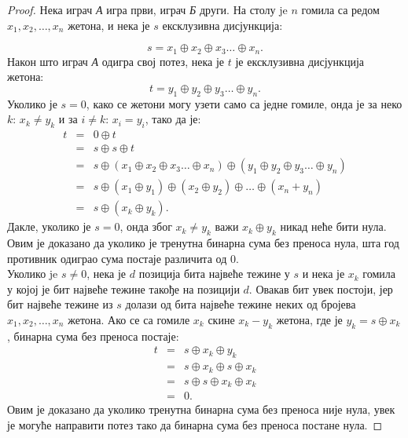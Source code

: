 \documentclass[a4paper]{article}
\begin{document}
\begin{proof}
	Нека играч \textit{А} игра први, играч \textit{Б} други. На столу je $ n $ гомила са редом $ x_{1}, x_{2}, \ldots , x_{n} $ жетона, и нека је $ s $ ексклузивна дисјункција: 
	
	\begin{displaymath}
		s = x_{1} \oplus x_{2} \oplus x_{3} \ldots \oplus x_{n}.
	\end{displaymath}	
	Након што играч \textit{А} одигра свој потез, нека је $ t $ је ексклузивна дисјункција жетона:
	\begin{displaymath}
		t = y_{1} \oplus y_{2} \oplus y_{3} \ldots \oplus y_{n}.
	\end{displaymath}
	 Уколико је $ s = 0 $, како се жетони могу узети само са једне гомиле, онда је за неко $ k $: $ x_{k} \neq y_{k} $ и за $ i \neq k $: $ x_{i} = y_{i} $, тако да је:	 
	 \begin{eqnarray*}
	 	t &=& 0 \oplus t \\
		  &=& s \oplus s \oplus t \\
		  &=& s \oplus (x_{1} \oplus x_{2} \oplus x_{3} \ldots \oplus x_{n}) \oplus (y_{1} \oplus y_{2} \oplus y_{3} \ldots \oplus y_{n}) \\
		  &=& s \oplus (x_{1} \oplus y_{1}) \oplus (x_{2} \oplus y_{2}) \oplus  \ldots \oplus (x_{n} + y_{n}) \\
		  &=& s \oplus (x_{k} \oplus y_{k}). 		 
	 \end{eqnarray*}
	 Дакле, уколико је $ s = 0 $, онда због $ x_{k} \neq y_{k} $ важи $ x_{k} \oplus y_{k} $ никад неће бити нула. Овим је доказано да уколико је тренутна бинарна сума без преноса нула, шта год противник одиграо сума постаје различита од $ 0 $.\\	 
	 Уколико je $ s \neq 0 $, нека је $ d $ позиција бита највеће тежине у $ s $ и нека је $ x_{k} $ гомила у којој је бит највеће тежине такође на позицији $ d $. Овакав бит увек постоји, јер бит највеће тежине из $ s $ долази од бита највеће тежине неких од бројева $ x_{1}, x_{2}, \ldots , x_{n} $ жетона. Ако се са гомиле $ x_{k} $ скине $ x_{k} - y_{k} $ жетона, где је $ y_{k} = s \oplus x_{k} $, бинарна сума без преноса постаје:
	 \begin{eqnarray*}
	 	t &=& s \oplus x_{k} \oplus y_{k} \\ 
	 	&=& s \oplus x_{k} \oplus s \oplus x_{k} \\
	 	&=& s \oplus s \oplus x_{k} \oplus x_{k} \\
	 	&=& 0.	 
	 \end{eqnarray*}	 
	 Овим је доказано да уколико тренутна бинарна сума без преноса није нула, увек је могуће направити потез тако да бинарна сума без преноса постане нула.
\end{proof}
\end{document}
